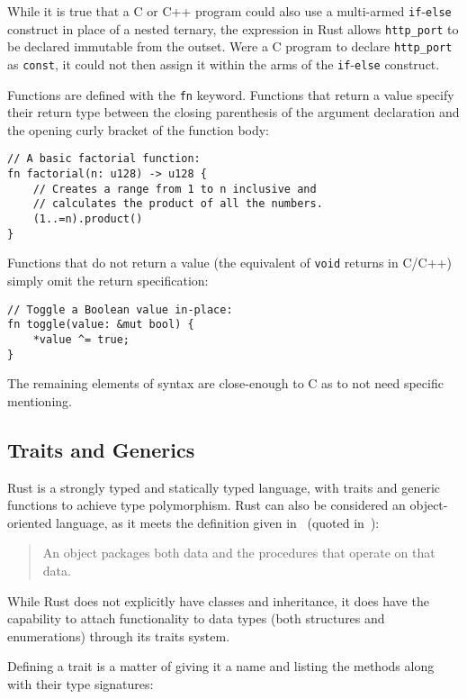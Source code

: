 While it is true that a C or C++ program could also use a multi-armed \texttt{if}-\texttt{else} construct in place of a nested ternary, the expression in Rust allows \texttt{http\_port} to be declared immutable from the outset. Were a C program to declare \texttt{http\_port} as \texttt{const}, it could not then assign it within the arms of the \texttt{if}-\texttt{else} construct.

Functions are defined with the \texttt{fn} keyword. Functions that return a value specify their return type between the closing parenthesis of the argument declaration and the opening curly bracket of the function body:

\begin{lstlisting}
// A basic factorial function:
fn factorial(n: u128) -> u128 {
    // Creates a range from 1 to n inclusive and
    // calculates the product of all the numbers.
    (1..=n).product()
}
\end{lstlisting}

Functions that do not return a value (the equivalent of \texttt{void} returns in C/C++) simply omit the return specification:

\begin{lstlisting}
// Toggle a Boolean value in-place:
fn toggle(value: &mut bool) {
    *value ^= true;
}
\end{lstlisting}

The remaining elements of syntax are close-enough to C as to not need specific mentioning.

\subsection{Traits and Generics}

Rust is a strongly typed and statically typed language, with traits and generic functions to achieve type polymorphism. Rust can also be considered an object-oriented language, as it meets the definition given in~\cite{design.patterns.1994} (quoted in~\cite[Chapter~17]{rpl.2019}):

\begin{quote}
An object packages both data and the procedures that operate on that data.
\end{quote}

While Rust does not explicitly have classes and inheritance, it does have the capability to attach functionality to data types (both structures and enumerations) through its traits system.

Defining a trait is a matter of giving it a name and listing the methods along with their type signatures:

